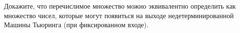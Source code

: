 Докажите, что перечислимое множество можно эквивалентно определить как множество чисел, которые могут
появиться на выходе недетерминированной Машины Тьюринга (при фиксированном входе).
